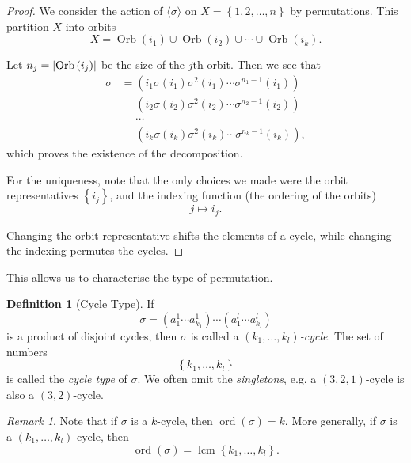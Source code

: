 \documentclass{article}
\theoremstyle{definition}
\newtheorem{definition}[theorem]{Definition}
\theoremstyle{remark}
\newtheorem{remark}[theorem]{Remark}
\DeclarePairedDelimiter{\abs}{\lvert}{\rvert}
\newcommand{\pqty}[1]{\left(#1\right)}
\newcommand{\Bqty}[1]{\left\{#1\right\}}
\newcommand{\angBrac}[1]{\langle #1\rangle}
\newcommand{\perm}[1]{(#1)}
\newcommand{\lcm}{\operatorname{lcm}}
\newcommand{\ord}{\operatorname{ord}}
\newcommand{\Orb}{\operatorname{Orb}}
\begin{document}
\begin{proof}
    We consider the action of \(\angBrac{\sigma}\) on \(X = \Bqty{1, 2, \ldots, n}\) by permutations. This partition \(X\) into orbits
    \[
        X = \Orb\pqty{i_1} \cup \Orb\pqty{i_2} \cup \cdots \cup \Orb\pqty{i_k}.
    \]

    Let \(n_j = \abs{\Orb\pqty{i_j}}\) be the size of the \(j\)th orbit. Then we see that
    \begin{align*}
        \sigma &= \perm{{i_1} {\sigma\pqty{i_1}} {\sigma^{2}\pqty{i_1}} \cdots {\sigma^{n_1 - 1} \pqty{i_1}}} \\
        &\phantom{=} \perm{{i_2} {\sigma\pqty{i_2}} {\sigma^{2}\pqty{i_2}} \cdots {\sigma^{n_2 - 1} \pqty{i_2}}} \\
        &\phantom{=} \cdots \\
        &\phantom{=} \perm{{i_k} {\sigma\pqty{i_k}} {\sigma^{2}\pqty{i_k}} \cdots {\sigma^{n_k - 1} \pqty{i_k}}},
    \end{align*}
    which proves the existence of the decomposition.

    For the uniqueness, note that the only choices we made were the orbit representatives \(\Bqty{i_j}\), and the indexing function (the ordering of the orbits)
    \[
        j \mapsto i_j.
    \]

    Changing the orbit representative shifts the elements of a cycle, while changing the indexing permutes the cycles.
\end{proof}

This allows us to characterise the type of permutation.

\begin{definition}[Cycle Type]
    \label{def:cycle-type}%
    If
    \[
        \sigma = \perm{{a_1^1} \cdots {a_{k_1}^1}} \cdots \perm{{a_1^l} \cdots {a_{k_l}^l}}
    \]
    is a product of disjoint cycles, then \(\sigma\) is called a \emph{\(\pqty{k_1, \ldots, k_l}\)-cycle}. The set of numbers
    \[
        \Bqty{k_1, \ldots, k_l}
    \]
    is called the \emph{cycle type} of \(\sigma\). We often omit the \emph{singletons}, e.g. a \(\pqty{3, 2, 1}\)-cycle is also a \(\pqty{3, 2}\)-cycle.
\end{definition}

\begin{remark}
    Note that if \(\sigma\) is a \(k\)-cycle, then \(\ord\pqty{\sigma} = k\). More generally, if \(\sigma\) is a \(\pqty{k_1, \ldots, k_l}\)-cycle, then
    \[
        \ord \pqty{\sigma} = \lcm \Bqty{k_1, \ldots, k_l}.
    \]
\end{remark}
\end{document}
